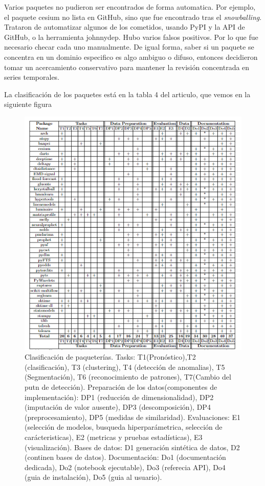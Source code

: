 \documentclass[a4paper, 11pt]{article}
\begin{document}
Varios paquetes no pudieron ser encontrados de forma automatica. Por ejemplo, el paquete cesium no lista en GitHub, sino que fue encontrado tras el \textit{snowballing}. Trataron de automatizar algunos de los cometidos, usando PyPI y la API de GitHub, o la herramienta johnnydep. Hubo varios falsos positivos. Por lo que fue necesario checar cada uno manualmente.
De igual forma, saber si un paquete se concentra en un dominio especifico es algo ambiguo o difuso, entonces decidieron tomar un acercamiento conservativo para mantener la revisión concentrada en series temporales.

La clasificación de los paquetes está en la tabla 4 del articulo, que vemos en la siguiente figura
\begin{figure}[H] 
    \centering 
    \includegraphics[width = 14cm]{Figures/packages.png} 
    \caption{Clasificación de paqueterías. Tasks: T1(Pronóstico),T2 (clasificación), T3 (clustering), T4 (detección de anomalias), T5 (Segmentación), T6 (reconocimiento de patrones), T7(Cambio del putn de detección). Preparación de los datos(componentes de implementación): DP1 (reducción de dimensionalidad), DP2 (imputación de valor ausente), DP3 (descomposición), DP4 (preprocesamiento), DP5 (medidas de similaridad). Evaluaciones: E1 (selección de modelos, busqueda hiperparámetrica, selección de carácteristicas), E2 (metricas y pruebas estadísticas), E3 (visualización). Bases de datos: D1 generación sintética de datos, D2 (continen bases de datos). Documentación: Do1 (documentación dedicada), Do2 (notebook ejecutable), Do3 (referecia API), Do4 (guia de instalación), Do5 (guia al usuario).}
    \label{Fig. }
\end{figure} 
\end{document}
